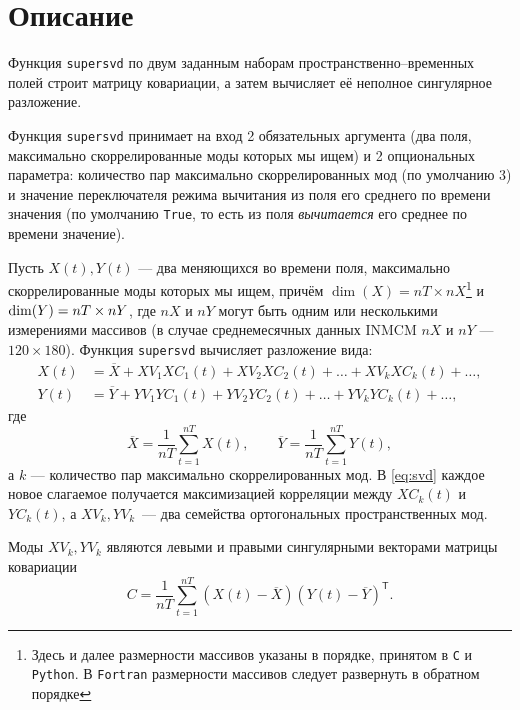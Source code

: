 \section{Описание}

Функция \texttt{supersvd} по двум заданным наборам пространственно--временных полей строит матрицу ковариации, а затем вычисляет её неполное сингулярное разложение. 

Функция \texttt{supersvd} принимает на вход 2 обязательных аргумента (два поля, максимально скоррелированные моды которых мы ищем) и 2 опциональных параметра: количество пар максимально скоррелированных мод (по умолчанию 3) и значение переключателя режима вычитания из поля его среднего по времени значения (по умолчанию \texttt{True}, то есть из поля \textit{вычитается} его среднее по времени значение).

Пусть $X(t), Y(t)$  --- два меняющихся во времени поля, максимально скоррелированные моды которых мы ищем, причём $\operatorname{dim}(X)=nT \times nX$\footnote{Здесь и далее размерности массивов указаны в порядке, принятом в \texttt{C} и \texttt{Python}. В \texttt{Fortran} размерности массивов следует развернуть в обратном порядке} и $\operatorname{dim}(Y)\hm=nT \times nY$, где $nX$ и $nY$ могут быть одним или несколькими измерениями массивов (в случае среднемесячных данных INMCM $nX$ и $nY$ --- $120 \times 180$). 
Функция \texttt{supersvd} вычисляет разложение вида:
\begin{equation}
\begin{aligned}
X(t) &= \overline{X} + XV_1 XC_1(t) + XV_2 XC_2(t) + \ldots + XV_k XC_k(t) + \ldots,\\
Y(t) &= \overline{Y} + YV_1 YC_1(t) + YV_2 YC_2(t) + \ldots + YV_k YC_k(t) + \ldots,
\end{aligned}
\label{eq:svd}
\end{equation}
где 
\begin{equation*}
\overline{X}=\frac{1}{nT}\sum_{t=1}^{nT} X(t),\qquad
\overline{Y}=\frac{1}{nT}\sum_{t=1}^{nT} Y(t),
\end{equation*}
а $k$ --- количество пар максимально скоррелированных мод. В \eqref{eq:svd} каждое новое слагаемое получается максимизацией корреляции между $XC_k(t)$ и $YC_k(t)$, а
$XV_k, YV_k$~--- два семейства ортогональных пространственных мод.

Моды $XV_k, YV_k$ являются левыми и правыми сингулярными векторами матрицы ковариации $$C =\frac{1}{nT} \sum_{t=1}^{nT} (X(t) - \overline{X}) (Y(t) - \overline{Y})^{\mathsf T}.$$

